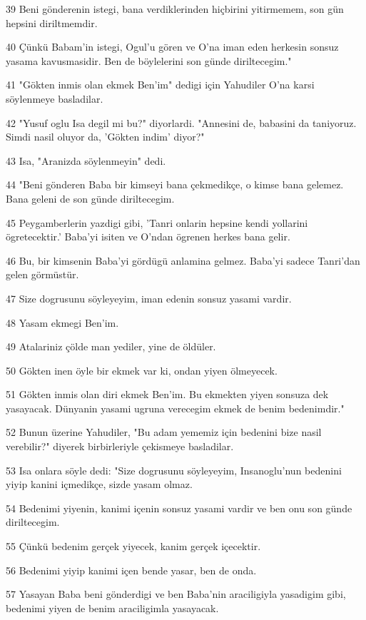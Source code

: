 \par 39 Beni gönderenin istegi, bana verdiklerinden hiçbirini yitirmemem, son gün hepsini diriltmemdir.
\par 40 Çünkü Babam'in istegi, Ogul'u gören ve O'na iman eden herkesin sonsuz yasama kavusmasidir. Ben de böylelerini son günde diriltecegim."
\par 41 "Gökten inmis olan ekmek Ben'im" dedigi için Yahudiler O'na karsi söylenmeye basladilar.
\par 42 "Yusuf oglu Isa degil mi bu?" diyorlardi. "Annesini de, babasini da taniyoruz. Simdi nasil oluyor da, 'Gökten indim' diyor?"
\par 43 Isa, "Aranizda söylenmeyin" dedi.
\par 44 "Beni gönderen Baba bir kimseyi bana çekmedikçe, o kimse bana gelemez. Bana geleni de son günde diriltecegim.
\par 45 Peygamberlerin yazdigi gibi, 'Tanri onlarin hepsine kendi yollarini ögretecektir.' Baba'yi isiten ve O'ndan ögrenen herkes bana gelir.
\par 46 Bu, bir kimsenin Baba'yi gördügü anlamina gelmez. Baba'yi sadece Tanri'dan gelen görmüstür.
\par 47 Size dogrusunu söyleyeyim, iman edenin sonsuz yasami vardir.
\par 48 Yasam ekmegi Ben'im.
\par 49 Atalariniz çölde man yediler, yine de öldüler.
\par 50 Gökten inen öyle bir ekmek var ki, ondan yiyen ölmeyecek.
\par 51 Gökten inmis olan diri ekmek Ben'im. Bu ekmekten yiyen sonsuza dek yasayacak. Dünyanin yasami ugruna verecegim ekmek de benim bedenimdir."
\par 52 Bunun üzerine Yahudiler, "Bu adam yememiz için bedenini bize nasil verebilir?" diyerek birbirleriyle çekismeye basladilar.
\par 53 Isa onlara söyle dedi: "Size dogrusunu söyleyeyim, Insanoglu'nun bedenini yiyip kanini içmedikçe, sizde yasam olmaz.
\par 54 Bedenimi yiyenin, kanimi içenin sonsuz yasami vardir ve ben onu son günde diriltecegim.
\par 55 Çünkü bedenim gerçek yiyecek, kanim gerçek içecektir.
\par 56 Bedenimi yiyip kanimi içen bende yasar, ben de onda.
\par 57 Yasayan Baba beni gönderdigi ve ben Baba'nin araciligiyla yasadigim gibi, bedenimi yiyen de benim araciligimla yasayacak.
